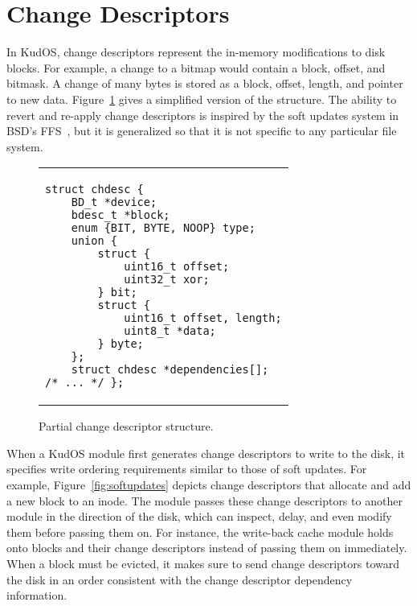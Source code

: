 \preparagraphspacing{}
\section*{Change Descriptors}
\label{sec:chdescs}

In KudOS, change descriptors represent the in-memory modifications to
disk blocks. For example, a change to a bitmap would contain a block,
offset, and bitmask. A change of many bytes is stored as a block,
offset, length, and pointer to new data. Figure~\ref{fig:chdesc} gives
a simplified version of the structure. The ability to revert and
re-apply change descriptors is inspired by the soft updates system in
BSD's FFS~\cite{ganger00soft}, but it is generalized so that it is not
specific to any particular file system.

\begin{figure}
\vskip-14pt
\begin{tabular}{@{\hskip0.58in}p{2in}@{}}
\begin{scriptsize}
\begin{verbatim}
struct chdesc {
    BD_t *device;
    bdesc_t *block;
    enum {BIT, BYTE, NOOP} type;
    union {
        struct {
            uint16_t offset;
            uint32_t xor;
        } bit;
        struct {
            uint16_t offset, length;
            uint8_t *data;
        } byte;
    };
    struct chdesc *dependencies[];
/* ... */ };
\end{verbatim}
\end{scriptsize}
\end{tabular}
\vspace{-10pt}
\caption{\label{fig:chdesc} Partial change descriptor structure.}
\end{figure}

When a KudOS module first generates change descriptors to write to the disk, it
specifies write ordering requirements similar to those of soft updates. For
example, Figure~\ref{fig:softupdates} depicts change descriptors that allocate
and add a new block to an inode.
%
The module passes these change descriptors to another module in the direction of
the disk, which can inspect, delay, and even modify them before passing them on.
%
For instance, the write-back cache module holds onto blocks and their change
descriptors instead of passing them on immediately.
%
When a block must be evicted, it makes sure to send change descriptors toward
the disk in an order consistent with the change descriptor dependency
information.

